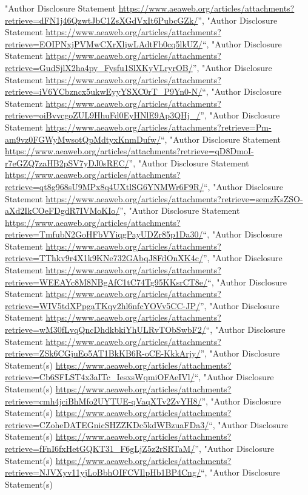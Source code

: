 \documentclass[]{article}
\begin{document}
\begin{itemize}
  "Author Disclosure Statement
  \url{https://www.aeaweb.org/articles/attachments?retrieve=dFN1j46QzwtJbC1ZsXGdVxIt6PubcGZk/}'',
  "Author Disclosure Statement
  \url{https://www.aeaweb.org/articles/attachments?retrieve=EOIPNxjPVMwCXrXljwLAdtFb0cq5lkUZ/}``,
  "Author Disclosure Statement
  \url{https://www.aeaweb.org/articles/attachments?retrieve=GudSjlX2ha4py_Fysfu1SlXKyVLryrOB/}'',
  "Author Disclosure Statement
  \url{https://www.aeaweb.org/articles/attachments?retrieve=iV6YCbzncx5ukwEyyYSXC0rT_P9Yn0-N/}``,
  "Author Disclosure Statement
  \url{https://www.aeaweb.org/articles/attachments?retrieve=oiBvvcgoZUL9HhuFd0EyHNlE9Ap3QHj_/}'',
  "Author Disclosure Statement
  \url{https://www.aeaweb.org/articles/attachments?retrieve=Pm-am9vz0FGWyMwsotQpMdtyxKnmDufw/}``,
  "Author Disclosure Statement
  \url{https://www.aeaweb.org/articles/attachments?retrieve=qD8DmoI-r7eGZQ7zaHB2pSV7yDJ0sREC/}'',
  "Author Disclosure Statement
  \url{https://www.aeaweb.org/articles/attachments?retrieve=qt8g968sU9MPx8q4UXtlSG6YNMWr6F9R/}``,
  "Author Disclosure Statement
  \url{https://www.aeaweb.org/articles/attachments?retrieve=semzKsZSO-aXd2IkCOeFDgdR7IVMoKIo/}'',
  "Author Disclosure Statement
  \url{https://www.aeaweb.org/articles/attachments?retrieve=TmfubN2GoHFbVYiqgPayUDZr85p1Da30/}``,
  "Author Disclosure Statement
  \url{https://www.aeaweb.org/articles/attachments?retrieve=TThkv9r4X1k9KNe732GAbqJ8FdOnXK4c/}'',
  "Author Disclosure Statement
  \url{https://www.aeaweb.org/articles/attachments?retrieve=WEEAYc8M8NBgAfC1tC74Tg95KKsrCT8e/}``,
  "Author Disclosure Statement
  \url{https://www.aeaweb.org/articles/attachments?retrieve=WIV5tdXPpgaTKqv2hl6nfcYOVv5CC-JP/}'',
  "Author Disclosure Statement
  \url{https://www.aeaweb.org/articles/attachments?retrieve=wM30fLvqQncDhdkbkiYhULRvTObSwbF2/}``,
  "Author Disclosure Statement
  \url{https://www.aeaweb.org/articles/attachments?retrieve=ZSk6CGjuEo5AT1BkKB6R-oCE-KkkArjy/}'',
  "Author Disclosure Statement(s)
  \url{https://www.aeaweb.org/articles/attachments?retrieve=Cb6SFLST4x3aITc_IesxsWqmiOFAeIVl/}``,
  "Author Disclosure Statement(s)
  \url{https://www.aeaweb.org/articles/attachments?retrieve=cmh4jciBhMfo2UYTUE-qVaqXTv2ZvYH8/}'',
  "Author Disclosure Statement(s)
  \url{https://www.aeaweb.org/articles/attachments?retrieve=CZoheDATEGnicSHZZKDc5kdWBzuaFDa3/}``,
  "Author Disclosure Statement(s)
  \url{https://www.aeaweb.org/articles/attachments?retrieve=fFnI6fxHetGQKT31_F6gLjZ5z2rSRTaM/}'',
  "Author Disclosure Statement(s)
  \url{https://www.aeaweb.org/articles/attachments?retrieve=NJVXyv11yjLoBbhOIFCVIlpHb1BP4Cng/}``,
  "Author Disclosure Statement(s)

\end{itemize}
\end{document}
